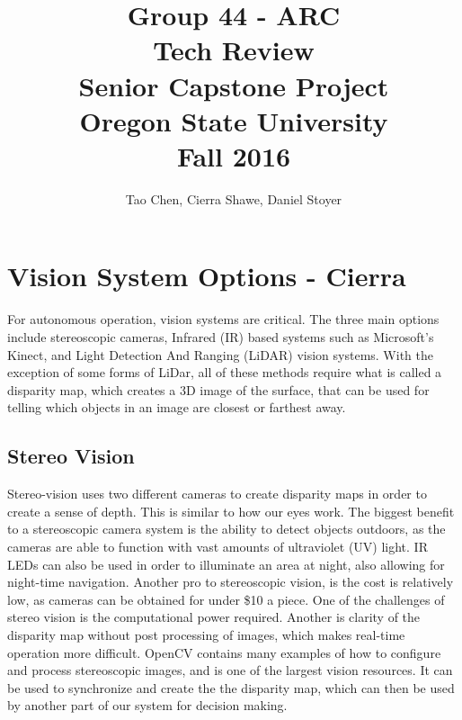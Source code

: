 \documentclass[compsoc,draftclsnofoot,onecolumn,10pt]{IEEEtran}
\begin{document}
\begin{titlepage}
\title{
Group 44 - ARC \\
Tech Review\\
\LARGE
Senior Capstone Project\\
Oregon State University\\
Fall 2016
}

\author{Tao Chen, Cierra Shawe, Daniel Stoyer}
\maketitle

\begin{abstract}

\end{abstract}

\thispagestyle{empty} %

\end{titlepage}
\newpage

\tableofcontents

\newpage

\section{Vision System Options - Cierra} %
For autonomous operation, vision systems are critical. 
The three main options include stereoscopic cameras, Infrared (IR) based systems such as Microsoft's Kinect, and Light Detection And Ranging (LiDAR) vision systems. 
With the exception of some forms of LiDar, all of these methods require what is called a disparity map, which creates a 3D image of the surface, that can be used for telling which objects in an image are closest or farthest away. 

\subsection{Stereo Vision}
Stereo-vision uses two different cameras to create disparity maps in order to create a sense of depth. 
This is similar to how our eyes work. 
The biggest benefit to a stereoscopic camera system is the ability to detect objects outdoors, as the cameras are able to function with vast amounts of ultraviolet (UV) light. 
IR LEDs can also be used in order to illuminate an area at night, also allowing for night-time navigation. 
Another pro to stereoscopic vision, is the cost is relatively low, as cameras can be obtained for under \$10 a piece.  
One of the challenges of stereo vision is the computational power required. 
Another is clarity of the disparity map without post processing of images, which makes real-time operation more difficult. 
\cite{acs}
OpenCV \cite{opencv} contains many examples of how to configure and process stereoscopic images, and is one of the largest vision resources. It can be used to synchronize and create the the disparity map, which can then be used by another part of our system for decision making. 
\end{document}
